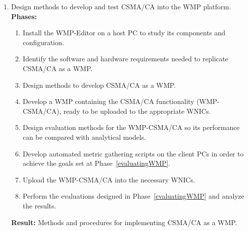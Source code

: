 \begin{enumerate}
% 	
	
	\item Design methods to develop and test CSMA/CA into the WMP platform.\label{learningWMP}\\
	
	{\bfseries Phases:}
	\begin{enumerate}
		\item Install the WMP-Editor on a host PC to study its components and configuration.\label{installWMP}
		\item Identify the software and hardware requirements needed to replicate CSMA/CA as a WMP.\label{WMPRequirements}
		\item Design methods to develop CSMA/CA as a WMP.\label{WMPCSMA-CA}
		\item Develop a WMP containing the CSMA/CA functionality (WMP-CSMA/CA), ready to be uploaded to the appropriate WNICs.
		\item Design evaluation methods for the WMP-CSMA/CA so its performance can be compared with analytical models.\label{evaluatingWMP}
		\item Develop automated metric gathering scripts on the client PCs in order to achieve the goals set at Phase~\ref{evaluatingWMP}.
		\item Upload the WMP-CSMA/CA into the necessary WNICs.
		\item Perform the evaluations designed in Phase~\ref{evaluatingWMP} and analyze the results.\label{WMPExperiment}\\
	\end{enumerate}
	{\bfseries Result:} Methods and procedures for implementing CSMA/CA as a WMP.\\


\end{enumerate}
